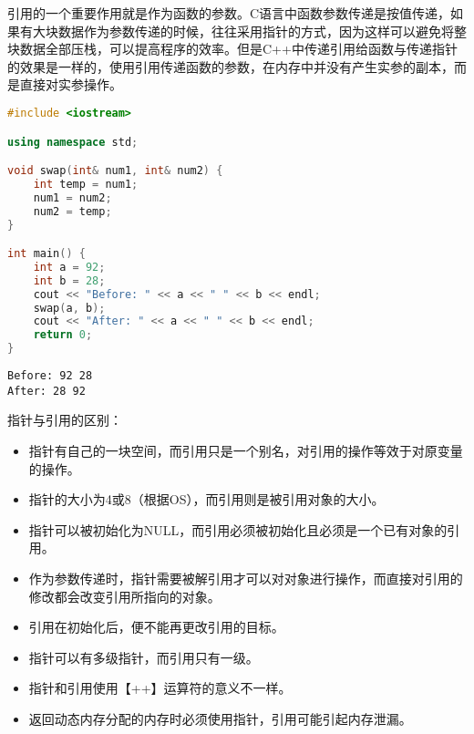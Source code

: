 引用的一个重要作用就是作为函数的参数。C语言中函数参数传递是按值传递，如果有大块数据作为参数传递的时候，往往采用指针的方式，因为这样可以避免将整块数据全部压栈，可以提高程序的效率。但是C++中传递引用给函数与传递指针的效果是一样的，使用引用传递函数的参数，在内存中并没有产生实参的副本，而是直接对实参操作。 \\


\begin{lstlisting}[language=C++]
#include <iostream>

using namespace std;

void swap(int& num1, int& num2) {
    int temp = num1;
    num1 = num2;
    num2 = temp;
}

int main() {
    int a = 92;
    int b = 28;
    cout << "Before: " << a << " " << b << endl;
    swap(a, b);
    cout << "After: " << a << " " << b << endl;
    return 0;
}
\end{lstlisting}

\begin{tcolorbox}
	\begin{verbatim}
Before: 92 28
After: 28 92
	\end{verbatim}
\end{tcolorbox}

指针与引用的区别：

\begin{itemize}
	\item 指针有自己的一块空间，而引用只是一个别名，对引用的操作等效于对原变量的操作。

	\item 指针的大小为4或8（根据OS），而引用则是被引用对象的大小。

	\item 指针可以被初始化为NULL，而引用必须被初始化且必须是一个已有对象的引用。

	\item 作为参数传递时，指针需要被解引用才可以对对象进行操作，而直接对引用的修改都会改变引用所指向的对象。

	\item 引用在初始化后，便不能再更改引用的目标。

	\item 指针可以有多级指针，而引用只有一级。

	\item 指针和引用使用【++】运算符的意义不一样。

	\item 返回动态内存分配的内存时必须使用指针，引用可能引起内存泄漏。
\end{itemize}

